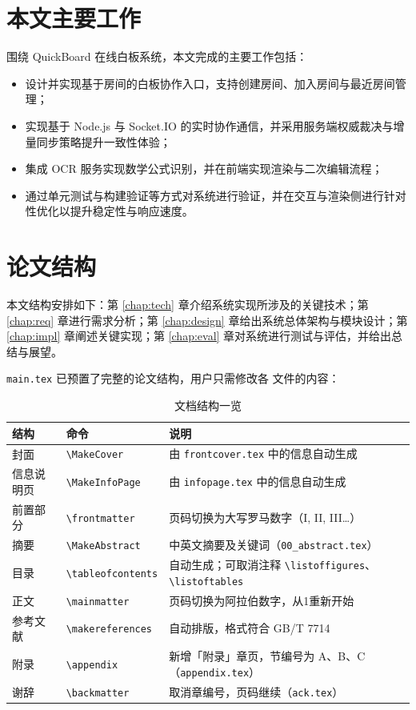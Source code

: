 \section{本文主要工作}
围绕 QuickBoard 在线白板系统，本文完成的主要工作包括：
\begin{itemize}
  \item 设计并实现基于房间的白板协作入口，支持创建房间、加入房间与最近房间管理；
  \item 实现基于 Node.js 与 Socket.IO 的实时协作通信，并采用服务端权威裁决与增量同步策略提升一致性体验；
  \item 集成 OCR 服务实现数学公式识别，并在前端实现渲染与二次编辑流程；
  \item 通过单元测试与构建验证等方式对系统进行验证，并在交互与渲染侧进行针对性优化以提升稳定性与响应速度。
\end{itemize}

\section{论文结构}
本文结构安排如下：第 \ref{chap:tech} 章介绍系统实现所涉及的关键技术；第 \ref{chap:req} 章进行需求分析；第 \ref{chap:design} 章给出系统总体架构与模块设计；第 \ref{chap:impl} 章阐述关键实现；第 \ref{chap:eval} 章对系统进行测试与评估，并给出总结与展望。

\verb|main.tex| 已预置了完整的论文结构，用户只需修改各 \verb|| 文件的内容：

\begin{table}[htbp]
  \centering
  \caption{文档结构一览}\label{tab:doc-structure}
  \renewcommand{\arraystretch}{1.3}
  \begin{tabular}{llp{7.5cm}}
    \toprule
    \textbf{结构} & \textbf{命令} & \textbf{说明} \\
    \midrule
    封面       & \verb|\MakeCover|      & 由 \verb|frontcover.tex| 中的信息自动生成 \\
    信息说明页 & \verb|\MakeInfoPage|   & 由 \verb|infopage.tex| 中的信息自动生成 \\
    前置部分   & \verb|\frontmatter|    & 页码切换为大写罗马数字（I, II, III\ldots） \\
    摘要     & \verb|\MakeAbstract|     & 中英文摘要及关键词（\verb|00_abstract.tex|） \\
    目录     & \verb|\tableofcontents|  & 自动生成；可取消注释 \verb|\listoffigures|、\verb|\listoftables| \\
    正文     & \verb|\mainmatter|       & 页码切换为阿拉伯数字，从1重新开始 \\
    参考文献 & \verb|\makereferences|   & 自动排版，格式符合 GB/T 7714 \\
    附录     & \verb|\appendix|         & 新增「附录」章页，节编号为 A、B、C（\verb|appendix.tex|） \\
    谢辞     & \verb|\backmatter|       & 取消章编号，页码继续（\verb|ack.tex|） \\
    \bottomrule
  \end{tabular}
\end{table}

